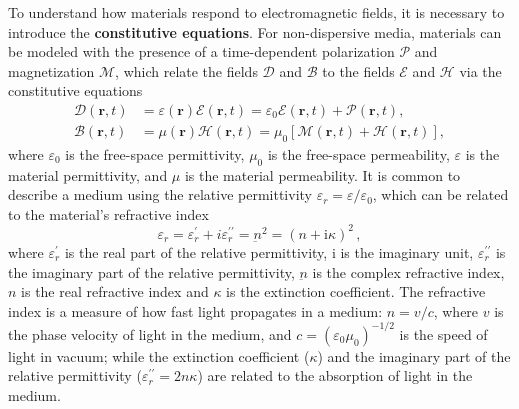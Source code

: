 To understand how materials respond to electromagnetic fields, it is necessary to introduce the \textbf{constitutive equations}.
 For non-dispersive media, materials can be
modeled
with the presence of a time-dependent polarization $\bm{\mathcal{P}}$ and
magnetization $\bm{\mathcal{M}}$,
which relate the fields $\bm{\mathcal{D}}$ and $\bm{\mathcal{B}}$ to the fields
$\bm{\mathcal{E}}$ and
$\bm{\mathcal{H}}$ via the constitutive equations
\begin{align}
    \bm{\mathcal{D}}(\mathbf{r}, t) & = \varepsilon(\mathbf{r}) \bm{\mathcal{E}}(\mathbf{r}, t) =
    \varepsilon_0 \bm{\mathcal{E}}(\mathbf{r}, t) + \bm{\mathcal{P}}(\mathbf{r}, t),
    \label{eq:D}                                                                \\
    \bm{\mathcal{B}}(\mathbf{r}, t) & =  \mu(\mathbf{r}) \bm{\mathcal{H}}(\mathbf{r},
    t) = \mu_0 \left[ \bm{\mathcal{M}}(\mathbf{r},
    t) + \bm{\mathcal{H}}(\mathbf{r}, t)\right] \label{eq:H},
\end{align}
where $\varepsilon_0$ is the free-space permittivity, $\mu_0$ is the free-space
permeability, $\varepsilon$ is the material permittivity, and 
$\mu$ is the material permeability. It is common to describe a medium
using the relative permittivity $\varepsilon_r=\varepsilon/\varepsilon_0$, which can be related to the material's refractive index~\cite{wooten}
\begin{equation}\label{eq:perm}
    \varepsilon_r = \varepsilon_r^\prime +
i \varepsilon_r^{\prime\prime} = \underbar{n}^2 = (n+\text{i}\kappa)^2\,,
\end{equation}
where $\varepsilon_r^\prime$ is the real part of the relative permittivity, $\text{i}$ is the imaginary unit, $\varepsilon_r^{\prime\prime}$ is the imaginary part of the relative permittivity, $\underbar{n}$ is the complex refractive index, 
$n$ is the real refractive index and $\kappa$ is the extinction coefficient. 
The refractive index is a measure of how fast light propagates in a medium: $n=v/c$, where $v$ is the phase velocity of light in the medium, and 
$c=(\varepsilon_0 \mu_0)^{-1/2}$ is the speed of light in vacuum; while the extinction
coefficient ($\kappa$) and the imaginary part of the relative permittivity ($\varepsilon_r^{\prime\prime}=2n\kappa$) are related to the absorption of light in the medium.

